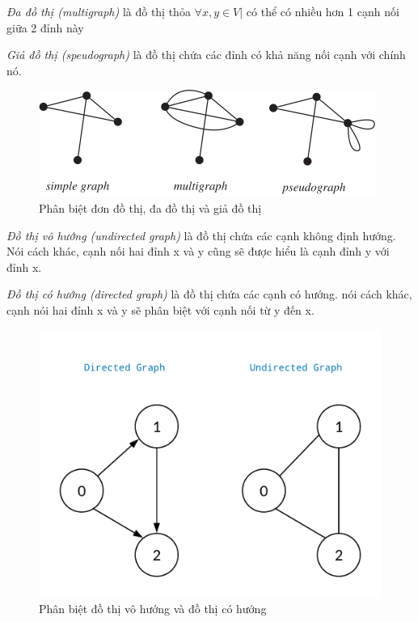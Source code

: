 \textit{Đa đồ thị (multigraph)} là đồ thị thỏa $\forall x,y \in V | $ có thể có nhiều hơn 1 cạnh nối giữa 2 đỉnh này 

\textit{Giả đồ thị (speudograph)} là đồ thị chứa các đỉnh có khả năng nối cạnh với chính nó.

\begin{figure}[H]
    \begin{center}
        \includegraphics[scale=0.8]{images/graph-type-1}
        \caption{Phân biệt đơn đồ thị, đa đồ thị và giả đồ thị}
        \label{fig:graph-type-1}
    \end{center}
\end{figure}

\textit{Đồ thị vô hướng (undirected graph)} là đồ thị chứa các cạnh không định hướng. Nói cách khác, cạnh nối hai đỉnh x và y cũng sẽ được hiểu là cạnh đỉnh y với đỉnh x.

\textit{Đồ thị có hướng (directed graph)} là đồ thị chứa các cạnh có hướng. nói cách khác, cạnh nói hai đỉnh x và y sẽ phân biệt với cạnh nối từ y đến x.

\begin{figure}[H]
    \begin{center}
        \includegraphics[scale=0.2]{images/graph-type-2}
        \caption{Phân biệt đồ thị vô hướng và đồ thị có hướng}
        \label{fig:graph-type-2}
    \end{center}
\end{figure}


